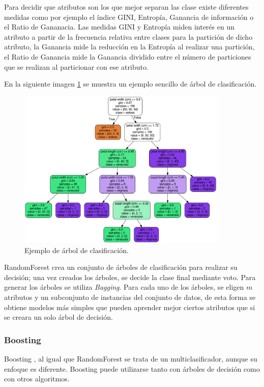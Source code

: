 Para decidir que atributos son los que mejor separan las clase existe diferentes medidas como por ejemplo el índice GINI, Entropía, Ganancia de información o el Ratio de Gananacia. Las medidas GINI y Entropía miden interés en un atributo a partir de la frecuencia relativa entre clases para la partición de dicho atributo, la Ganancia mide la reducción en la Entropía al realizar una partición, el Ratio de Ganancia mide la Ganancia dividido entre el número de particiones que se realizan al particionar con ese atributo. \newline

En la siguiente imagen \ref{fig:216} se muestra un ejemplo sencillo de árbol de clasificación.

\begin{figure}[H]
	\centering
	\includegraphics[width=100mm]{imagenes/tree_example.png}
	\caption{Ejemplo de árbol de clasificación.}
	\label{fig:216}
\end{figure}
\verticalspace

RandomForest crea un conjunto de árboles de clasificación para realizar su decisión; una vez creados los árboles, se decide la clase final mediante voto. Para generar los árboles se utiliza \textit{Bagging}. Para cada uno de los árboles, se eligen $m$ atributos y un subconjunto de instancias del conjunto de datos, de esta forma se obtiene modelos más simples que pueden aprender mejor ciertos atributos que si se creara un solo árbol de decisión.\newline

\subsubsection{Boosting}
Boosting \cite{schapire1999brief}, al igual que RandomForest se trata de un multiclasificador, aunque su enfoque es diferente. Boosting puede utilizarse tanto con árboles de decisión como con otros algoritmos.\newline

